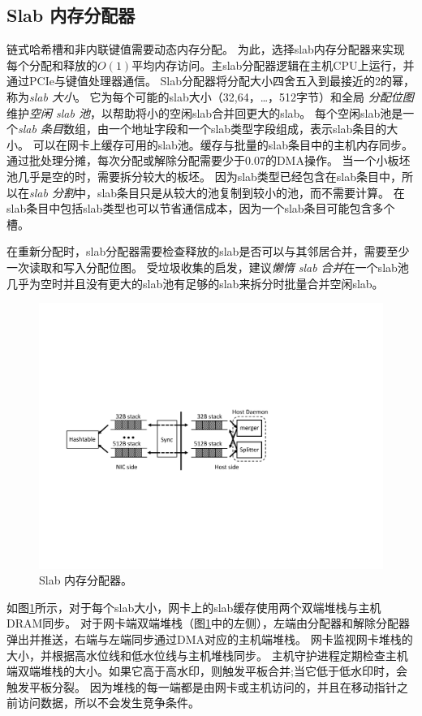 \subsection{Slab 内存分配器}
\label{kvdirect:sec:slab}

链式哈希槽和非内联键值需要动态内存分配。
为此，选择slab内存分配器\cite {bonwick1994slab}来实现每个分配和释放的$O(1)$平均内存访问。主slab分配器逻辑在主机CPU上运行，并通过PCIe与键值处理器通信。
Slab分配器将分配大小四舍五入到最接近的2的幂，称为\textit {slab 大小}。
它为每个可能的slab大小（32,64，\ldots，512字节）和全局 \textit {分配位图}维护\textit {空闲 slab 池}，以帮助将小的空闲slab合并回更大的slab。
每个空闲slab池是一个\textit {slab 条目}数组，由一个地址字段和一个slab类型字段组成，表示slab条目的大小。
可以在网卡上缓存可用的slab池。缓存与批量的slab条目中的主机内存同步。通过批处理分摊，每次分配或解除分配需要少于0.07的DMA操作。
当一个小板坯池几乎是空的时，需要拆分较大的板坯。
因为slab类型已经包含在slab条目中，所以在\textit {slab 分割}中，slab条目只是从较大的池复制到较小的池，而不需要计算。
在slab条目中包括slab类型也可以节省通信成本，因为一个slab条目可能包含多个槽。

在重新分配时，slab分配器需要检查释放的slab是否可以与其邻居合并，需要至少一次读取和写入分配位图。
受垃圾收集的启发，建议\textit {懒惰 slab 合并}在一个slab池几乎为空时并且没有更大的slab池有足够的slab来拆分时批量合并空闲slab。


\begin{figure}[htbp]
	\centering
	\includegraphics[width=.8\textwidth,page=1]{figure/cropped_slab.pdf}
	\caption{Slab 内存分配器。}
	\label{kvdirect:fig:slab}
	
\end{figure}

如图\ref {kvdirect:fig:slab}所示，对于每个slab大小，网卡上的slab缓存使用两个双端堆栈与主机DRAM同步。
对于网卡端双端堆栈（图\ref {kvdirect:fig:slab}中的左侧），左端由分配器和解除分配器弹出并推送，右端与左端同步通过DMA对应的​​主机端堆栈。
网卡监视网卡堆栈的大小，并根据高水位线和低水位线与主机堆栈同步。
主机守护进程定期检查主机端双端堆栈的大小。如果它高于高水印，则触发平板合并;当它低于低水印时，会触发平板分裂。
因为堆栈的每一端都是由网卡或主机访问的，并且在移动指针之前访问数据，所以不会发生竞争条件。

